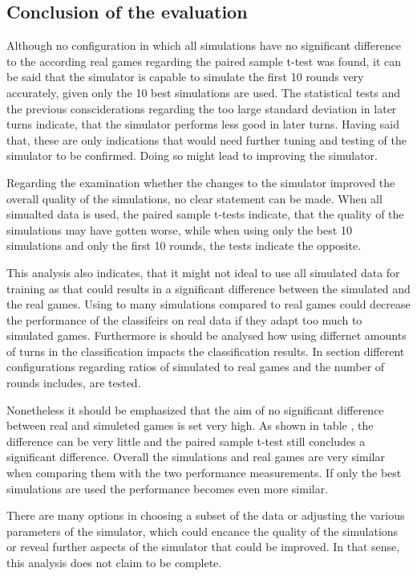 \subsection{Conclusion of the evaluation}
\label{conclusion_of_the_evaluation}
Although no configuration in which all simulations have no significant difference to the according real games regarding the paired sample t-test was found, it can be said that the simulator is capable to simulate the first 10 rounds very accurately, given only the 10 best simulations are used. The statistical tests and the previous consciderations regarding the too large standard deviation in later turns indicate, that the simulator performs less good in later turns. Having said that, these are only indications that would need further tuning and testing of the simulator to be confirmed. Doing so might lead to improving the simulator. 

Regarding the examination whether the changes to the simulator improved the overall quality of the simulations, no clear statement can be made. When all simualted data is used, the paired sample t-tests indicate, that the quality of the simulations may have gotten worse, while when using only the best 10 simulations and only the first 10 rounds, the tests indicate the opposite. 

This analysis also indicates, that it might not ideal to use all simulated data for training as that could results in a significant difference between the simulated and the real games. Using to many simulations compared to real games could decrease the performance of the classifeirs on real data if they adapt too much to simulated games. Furthermore is should be analysed how using differnet amounts of turns in the classification impacts the classification results. In section  different configurations regarding ratios of simulated to real games and the number of rounds includes, are tested. 

Nonetheless it should be emphasized that the aim of no significant difference between real and simuleted games is set very high. As shown in table , the difference can be very little and the paired sample t-test still concludes a significant difference. Overall the simulations and real games are very similar when comparing them with the two performance measurements. If only the best simulations are used the performance becomes even more similar.  

There are many options in choosing a subset of the data or adjusting the various parameters of the simulator, which could encance the quality of the simulations or reveal further aspects of the simulator that could be improved. In that sense, this analysis does not claim to be complete.

